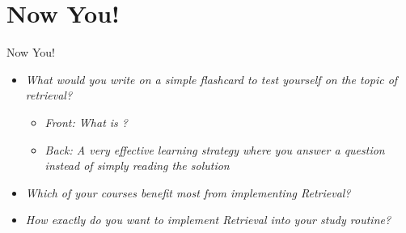 \documentclass{ercisbeamer}
\begin{document}
\section{Now You!}
\begin{frame}{Now You!}
    \begin{itemize}
        \item \emph{What would you write on a simple flashcard to test yourself on the topic of retrieval?} \pause
        \begin{itemize}
            \item \emph{Front: What is ?}
            \item \emph{Back: A very effective learning strategy where you answer a question instead of simply reading the solution}
        \end{itemize}
        \item \emph{Which of your courses benefit most from implementing Retrieval?}
        \item \emph{How exactly do you want to implement Retrieval into your study routine?}
    \end{itemize}
\end{frame}



\sources
\end{document}
